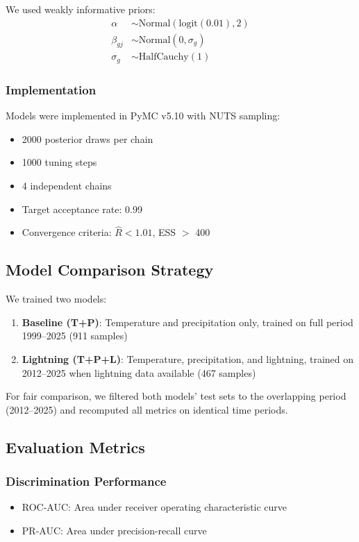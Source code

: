\documentclass[11pt,a4paper]{article}
\begin{document}
We used weakly informative priors:
\begin{align}
\alpha &\sim \text{Normal}(\text{logit}(0.01), 2) \\
\beta_{gj} &\sim \text{Normal}(0, \sigma_g) \\
\sigma_g &\sim \text{HalfCauchy}(1)
\end{align}

\subsubsection{Implementation}

Models were implemented in PyMC v5.10 with NUTS sampling:
\begin{itemize}
    \item 2000 posterior draws per chain
    \item 1000 tuning steps
    \item 4 independent chains
    \item Target acceptance rate: 0.99
    \item Convergence criteria: $\hat{R} < 1.01$, ESS $>$ 400
\end{itemize}

\subsection{Model Comparison Strategy}

We trained two models:
\begin{enumerate}
    \item \textbf{Baseline (T+P)}: Temperature and precipitation only, trained on full period 1999--2025 (911 samples)
    \item \textbf{Lightning (T+P+L)}: Temperature, precipitation, and lightning, trained on 2012--2025 when lightning data available (467 samples)
\end{enumerate}

For fair comparison, we filtered both models' test sets to the overlapping period (2012--2025) and recomputed all metrics on identical time periods.

\subsection{Evaluation Metrics}

\subsubsection{Discrimination Performance}
\begin{itemize}
    \item ROC-AUC: Area under receiver operating characteristic curve
    \item PR-AUC: Area under precision-recall curve
\end{itemize}
\end{document}
